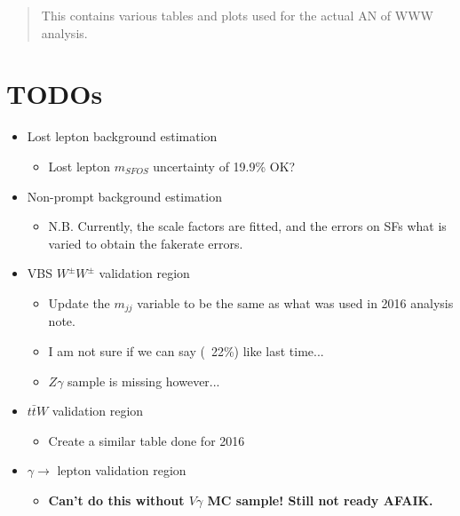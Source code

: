 \documentclass[12pt]{article}
\newcommand{\note}[1]{\textbf{\color{red} #1}}
\begin{document}
\maketitle

\begin{abstract}
This contains various tables and plots used for the actual AN of WWW analysis.
\end{abstract}

\section{TODOs}

\begin{itemize}
    \item Lost lepton background estimation
        \begin{itemize}
            \item Lost lepton $m_{SFOS}$ uncertainty of 19.9\% OK?
        \end{itemize}
    \item Non-prompt background estimation
        \begin{itemize}
            \item N.B. Currently, the scale factors are fitted, and the errors on SFs what is varied to obtain the fakerate errors.
        \end{itemize}
    \item VBS $W^{\pm}W^{\pm}$ validation region
        \begin{itemize}
            \item Update the $m_{jj}$ variable to be the same as what was used in 2016 analysis note.
            \item I am not sure if we can say (~22\%) like last time...
            \item $Z\gamma$ sample is missing however...
        \end{itemize}
    \item $t\bar{t}W$ validation region
        \begin{itemize}
            \item Create a similar table done for 2016
        \end{itemize}
    \item $\gamma\rightarrow$ lepton validation region
        \begin{itemize}
            \item \note{Can't do this without $V\gamma$ MC sample! Still not ready AFAIK.}
        \end{itemize}

\end{itemize}
\end{document}
